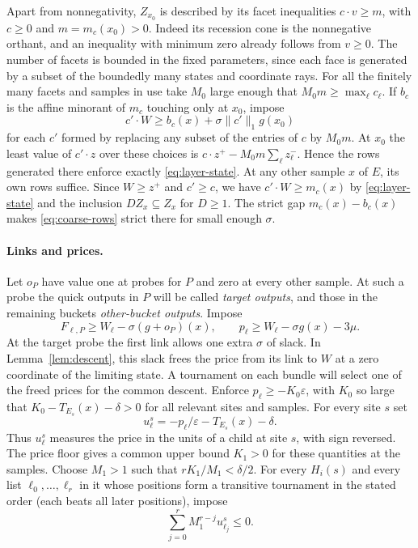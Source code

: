 Apart from nonnegativity, $Z_{x_0}$ is described by its facet
inequalities $c\cdot v\ge m$, with $c\ge0$ and $m=m_c(x_0)>0$.
Indeed its recession cone is the nonnegative orthant, and an
inequality with minimum zero already follows from $v\ge0$.
The number of facets is bounded in the fixed parameters, since each
face is generated by a subset of the boundedly many states and coordinate
rays. For all the finitely many facets and samples in use take $M_0$
large enough that $M_0m\ge\max_\ell c_\ell$. If $b_c$ is the affine
minorant of $m_c$ touching only at $x_0$, impose
\begin{equation}\label{eq:coarse-rows}
 c'\cdot W\ge b_c(x)+\sigma\|c'\|_1g(x_0)
\end{equation}
for each $c'$ formed by replacing any subset of the entries of $c$
by $M_0m$. At $x_0$ the least value of $c'\cdot z$ over these
choices is $c\cdot z^+-M_0m\sum_\ell z_\ell^-$. Hence the rows
generated there enforce exactly \eqref{eq:layer-state}. At any other
sample $x$ of $E$, its own rows suffice. Since $W\ge z^+$ and $c'\ge c$,
we have $c'\cdot W\ge m_c(x)$ by \eqref{eq:layer-state} and the
inclusion $D Z_x\subseteq Z_x$ for $D\ge1$. The strict gap
$m_c(x)-b_c(x)$ makes \eqref{eq:coarse-rows} strict there for small
enough $\sigma$.

\paragraph{Links and prices.}
Let $o_P$ have value one at probes for $P$ and zero at every other
sample. At such a probe the quick outputs in $P$ will be called
\emph{target outputs}, and those in the remaining buckets \emph{other-bucket outputs}. Impose
\begin{equation}\label{eq:module-link}
 F_{\ell,P}\ge W_\ell-\sigma (g+o_P)(x),\qquad
 p_\ell\ge W_\ell-\sigma g(x)-3\mu .
\end{equation}
At the target probe the first link allows one extra \(\sigma\) of slack.
In Lemma~\ref{lem:descent}, this slack frees the price from its link to
\(W\) at a zero coordinate of the limiting state. A tournament on each
bundle will select one of the freed prices for the common descent. Enforce $p_\ell\ge-K_0\varepsilon$, with $K_0$ so large
that $K_0-T_{E_s}(x)-\delta>0$ for all relevant sites and samples.
For every site $s$ set
\[
 u_\ell^s=-p_\ell/\varepsilon-T_{E_s}(x)-\delta .
\]
Thus \(u_\ell^s\) measures the price in the units of a child at site
\(s\), with sign reversed. The price floor gives a common upper bound
\(K_1>0\) for these quantities at the samples. Choose $M_1>1$ such that $rK_1/M_1<\delta/2$.
For every $H_i(s)$ and every list $\ell_0,\ldots,\ell_r$ in it whose
positions form a transitive tournament in the stated order (each
beats all later positions), impose
\begin{equation}\label{eq:module-tournament}
 \sum_{j=0}^r M_1^{r-j}u_{\ell_j}^s\le0 .
\end{equation}

